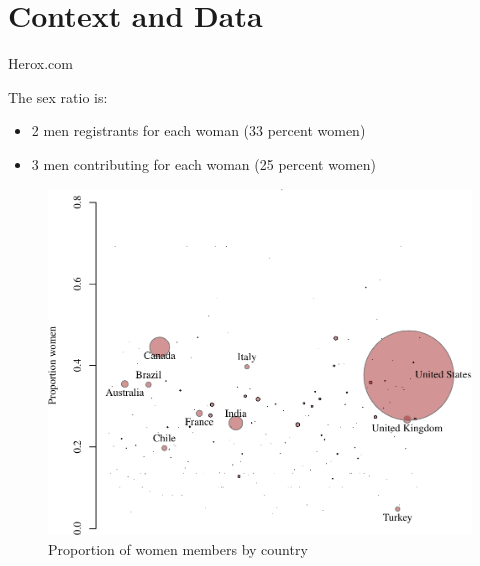 \section{Context and Data}\label{context-and-data}

\begin{frame}{Herox.com}

The sex ratio is:

\begin{itemize}
\tightlist
\item
  2 men registrants for each woman (33 percent women)
\item
  3 men contributing for each woman (25 percent women)
\end{itemize}

\end{frame}

\begin{frame}

\begin{figure}
\centering
\includegraphics{deck_files/figure-beamer/bayes-1.pdf}
\caption{Proportion of women members by country}
\end{figure}

\end{frame}

